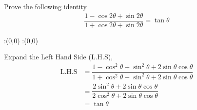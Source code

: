 

\question[2] Prove the following identity
\begin{align}
  \dfrac{1-\cos2\theta+\sin2\theta}
    {1+\cos2\theta+\sin2\theta} = \tan\theta
\end{align}


\ifprintanswers
  \begin{marginfigure}
      :(0,0)
      :(0,0)
    \figdrawbegin{}
      \figdrawline [100,101]
    \figdrawend
    \figvisu{\figBoxA}{}{%
    }
    \centerline{\box\figBoxA}
  \end{marginfigure}
\fi 

\begin{solution}[\halfpage]
  Expand the Left Hand Side (L.H.S),
  \begin{align}
    \text{L.H.S} &= \dfrac{1-\cos^2\theta+\sin^2\theta+
                            2\sin\theta\cos\theta}
                          {1+\cos^2\theta-\sin^2\theta+
                            2\sin\theta\cos\theta} \\
                 &= \dfrac{2\sin^2\theta+2\sin\theta\cos\theta}
                            {2\cos^2\theta+2\sin\theta\cos\theta} \\
                 &= \tan\theta
  \end{align}
\end{solution}

